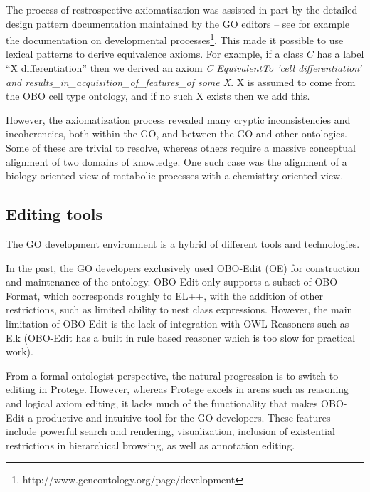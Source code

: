 \documentclass{llncs}
\begin{document}
The process of restrospective axiomatization was assisted in part by
the detailed design pattern documentation maintained by the GO editors
-- see for example the documentation on developmental
processes\footnote{http://www.geneontology.org/page/development}. This
made it possible to use lexical patterns to derive equivalence
axioms\cite{Mungall2010GOXP}. For example, if a class $C$ has a label
``X differentiation'' then we derived an axiom \emph{C EquivalentTo
  'cell differentiation' and
  results\_in\_acquisition\_of\_features\_of some X}. X is assumed to
come from the OBO cell type ontology, and if no such X exists then we
add this.

However, the axiomatization process revealed many cryptic
inconsistencies and incoherencies, both within the GO, and between the
GO and other ontologies. Some of these are trivial to resolve, whereas
others require a massive conceptual alignment of two domains of
knowledge. One such case was the alignment of a biology-oriented view of
metabolic processes with a chemisttry-oriented view\cite{Hill2013}.


\subsection{Editing tools}

The GO development environment is a hybrid of different tools and
technologies.

In the past, the GO developers exclusively used
OBO-Edit (OE)\cite{Day-Richter2007} for construction and maintenance of the
ontology. OBO-Edit only supports a subset of OBO-Format, which
corresponds roughly to EL++, with the addition of other restrictions,
such as limited ability to nest class expressions. However, the main
limitation of OBO-Edit is the lack of integration with OWL Reasoners
such as Elk (OBO-Edit has a built in rule based reasoner which is too
slow for practical work).

From a formal ontologist perspective, the natural progression is to
switch to editing in Protege. However, whereas Protege excels in areas
such as reasoning and logical axiom editing, it lacks much of the
functionality that makes OBO-Edit a productive and intuitive tool for
the GO developers. These features include powerful search and
rendering, visualization, inclusion of existential restrictions in
hierarchical browsing, as well as annotation editing. %
\end{document}
